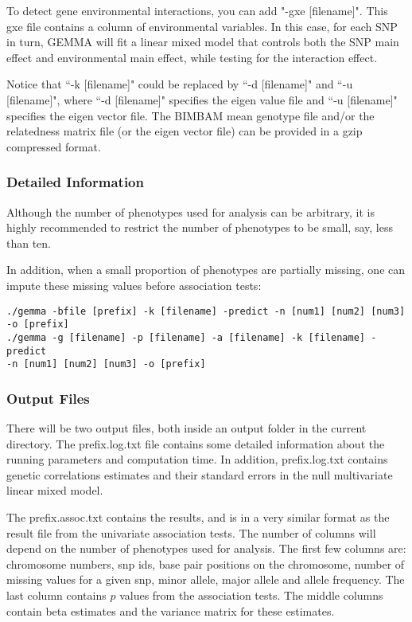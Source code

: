 \documentclass[11pt]{article}
\begin{document}
To detect gene environmental interactions, you can add "-gxe [filename]". This gxe file contains a column of environmental variables. In this case, for each SNP in turn, GEMMA will fit a linear mixed model that controls both the SNP main effect and environmental main effect, while testing for the interaction effect. 

Notice that ``-k [filename]" could be replaced by ``-d [filename]" and ``-u [filename]", where ``-d [filename]" specifies the eigen value file and ``-u [filename]" specifies the eigen vector file. The BIMBAM mean genotype file and/or the relatedness matrix file (or the eigen vector file) can be provided in a gzip compressed format.

\subsubsection{Detailed Information}
Although the number of phenotypes used for analysis can be arbitrary, it is highly recommended to restrict the number of phenotypes to be small, say, less than ten. 

In addition, when a small proportion of phenotypes are partially missing, one can impute these missing values before association tests:
\begin{verbatim}
./gemma -bfile [prefix] -k [filename] -predict -n [num1] [num2] [num3] -o [prefix]
./gemma -g [filename] -p [filename] -a [filename] -k [filename] -predict 
-n [num1] [num2] [num3] -o [prefix]
\end{verbatim}

\subsubsection{Output Files}
There will be two output files, both inside an output folder in the current directory. The prefix.log.txt file contains some detailed information about the running parameters and computation time. In addition, prefix.log.txt contains genetic correlations estimates and their standard errors in the null multivariate linear mixed model.

The prefix.assoc.txt contains the results, and is in a very similar format as the result file from the univariate association tests. The number of columns will depend on the number of phenotypes used for analysis. The first few columns are: chromosome numbers, snp ids, base pair positions on the chromosome, number of missing values for a given snp, minor allele, major allele and allele frequency. The last column contains $p$ values from the association tests. The middle columns contain beta estimates and the variance matrix for these estimates. 
\end{document}
